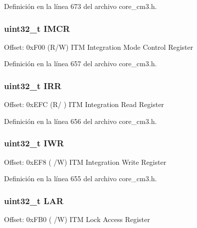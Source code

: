 Definición en la línea 673 del archivo core\+\_\+cm3.\+h.

\subsubsection[{\texorpdfstring{I\+M\+CR}{IMCR}}]{ uint32\+\_\+t I\+M\+CR}\hypertarget{struct_i_t_m___type_aa75460116777434aebcd8698b46514cd}{}\label{struct_i_t_m___type_aa75460116777434aebcd8698b46514cd}
Offset\+: 0x\+F00 (R/W) I\+TM Integration Mode Control Register 

Definición en la línea 657 del archivo core\+\_\+cm3.\+h.

\subsubsection[{\texorpdfstring{I\+RR}{IRR}}]{ uint32\+\_\+t I\+RR}\hypertarget{struct_i_t_m___type_a5f1859b657556cbeeb743b0da2e71654}{}\label{struct_i_t_m___type_a5f1859b657556cbeeb743b0da2e71654}
Offset\+: 0x\+E\+FC (R/ ) I\+TM Integration Read Register 

Definición en la línea 656 del archivo core\+\_\+cm3.\+h.

\subsubsection[{\texorpdfstring{I\+WR}{IWR}}]{ uint32\+\_\+t I\+WR}\hypertarget{struct_i_t_m___type_ae13374b53589f16b2fc2c868d779a9c7}{}\label{struct_i_t_m___type_ae13374b53589f16b2fc2c868d779a9c7}
Offset\+: 0x\+E\+F8 ( /W) I\+TM Integration Write Register 

Definición en la línea 655 del archivo core\+\_\+cm3.\+h.

\subsubsection[{\texorpdfstring{L\+AR}{LAR}}]{ uint32\+\_\+t L\+AR}\hypertarget{struct_i_t_m___type_aa2c0f411bbcc7b7c7a558a964996dc11}{}\label{struct_i_t_m___type_aa2c0f411bbcc7b7c7a558a964996dc11}
Offset\+: 0x\+F\+B0 ( /W) I\+TM Lock Access Register 

